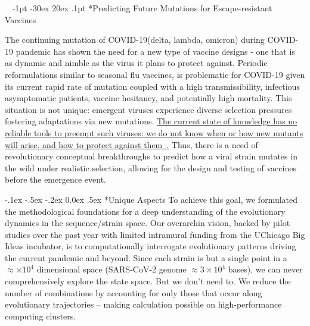 \documentclass[onecolumn, compsoc,12pt]{IEEEtran}
\makeatletter
\renewcommand\section{\@startsection {section}{1}{\z@}%
                                   {-1pt \@plus -30ex \@minus 20ex}%
                                   {.1pt}%
                                   {\large\bfseries\scshape}}
\renewcommand\paragraph{\@startsection {section}{1}{\z@}%
                                   {-.1ex \@plus -.5ex \@minus -.2ex}%
                                   {0.0ex \@plus.5ex}%
                                   {\fontsize{11}{10}\selectfont\bfseries\itshape\sffamily\color{black}}}
\def\hcov{SARS-CoV-2\xspace}
\def\cov{COVID-19\xspace}
\makeatother
\begin{document}
 

\vspace{20pt}



\clearpage
\setcounter{page}{1}


$\phantom{x}$
\vspace{-35pt}  
\section*{Predicting Future Mutations for  Escape-resistant Vaccines}


The continuing mutation of \cov (delta, lambda, omicron) during \cov pandemic  has shown the need for a new type of vaccine designs - one that is as dynamic and nimble as the virus it plans to protect against. Periodic reformulations similar to  seasonal  flu vaccines,  is  problematic for \cov given its current rapid rate of mutation coupled with a high transmissibility, infectious asymptomatic patients, vaccine hesitancy, and potentially high mortality. This situation is not unique: emergent viruses experience diverse  selection pressures fostering  adaptations via new mutations. \uline{The current state of knowledge has no reliable tools to preempt such viruses: we do not know when or how new mutants will arise, and how to protect against them~\cite{gou2020systematic}\cite{fair2019viral}.} 
Thus, there is a need of revolutionary conceptual  breakthroughs to predict how a viral strain  mutates in the wild under realistic selection, allowing for the design and testing of vaccines before the emergence event.

\paragraph*{Unique Aspects} To achieve this goal, we formulated the methodological foundations for a deep understanding of the evolutionary dynamics  in  the sequence/strain space. Our overarchin vision, backed by pilot studies over the past year with limited intramural  funding from the UChicago Big Ideas  incubator, is to  computationally interrogate  evolutionary patterns driving  the current  pandemic and beyond. Since each  strain is but a single point in a  $\approx  \times10^4$ dimensional space (\hcov genome  $\approx 3 \times 10^4$ bases), we can never comprehensively explore the  state space. But we don't need to. We reduce the number of combinations by accounting for only those that occur along evolutionary trajectories – making calculation possible on high-performance computing clusters.
\end{document}
